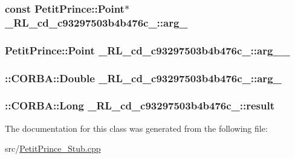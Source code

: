 \subsubsection[{\texorpdfstring{arg\+\_\+1}{arg_1}}]{\setlength{\rightskip}{0pt plus 5cm}const Petit\+Prince\+::\+Point$\ast$ \+\_\+R\+L\+\_\+cd\+\_\+c93297503b4b476c\+\_\+::arg\+\_}\hypertarget{class__0_r_l__cd__c93297503b4b476c__11000000_ab3cb660dcca4e79904955484dce2b56e}{}\label{class__0_r_l__cd__c93297503b4b476c__11000000_ab3cb660dcca4e79904955484dce2b56e}
\subsubsection[{\texorpdfstring{arg\+\_\+1\+\_\+}{arg_1_}}]{\setlength{\rightskip}{0pt plus 5cm}Petit\+Prince\+::\+Point \+\_\+R\+L\+\_\+cd\+\_\+c93297503b4b476c\+\_\+::arg\+\_\+\_\+}\hypertarget{class__0_r_l__cd__c93297503b4b476c__11000000_a36cb208c9c1152cddc301d382e4fec23}{}\label{class__0_r_l__cd__c93297503b4b476c__11000000_a36cb208c9c1152cddc301d382e4fec23}
\subsubsection[{\texorpdfstring{arg\+\_\+2}{arg_2}}]{\setlength{\rightskip}{0pt plus 5cm}\+::C\+O\+R\+B\+A\+::\+Double \+\_\+R\+L\+\_\+cd\+\_\+c93297503b4b476c\+\_\+::arg\+\_}\hypertarget{class__0_r_l__cd__c93297503b4b476c__11000000_a67084e7fa5c434110e588481b53a61c2}{}\label{class__0_r_l__cd__c93297503b4b476c__11000000_a67084e7fa5c434110e588481b53a61c2}
\subsubsection[{\texorpdfstring{result}{result}}]{\setlength{\rightskip}{0pt plus 5cm}\+::C\+O\+R\+B\+A\+::\+Long \+\_\+R\+L\+\_\+cd\+\_\+c93297503b4b476c\+\_\+::result}\hypertarget{class__0_r_l__cd__c93297503b4b476c__11000000_a5e87affab2cb58f2a874bb8572df0486}{}\label{class__0_r_l__cd__c93297503b4b476c__11000000_a5e87affab2cb58f2a874bb8572df0486}


The documentation for this class was generated from the following file\+:\begin{DoxyCompactItemize}
\item 
src/\hyperlink{_petit_prince___stub_8cpp}{Petit\+Prince\+\_\+\+Stub.\+cpp}\end{DoxyCompactItemize}
